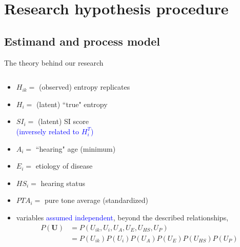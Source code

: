 \section{Research hypothesis procedure}
%
%
\subsection{Estimand and process model}
%
%
\begin{frame}[t, negative]
	\subsectionpage
\end{frame}
%
%
\begin{frame}
	{The theory behind our research}
	\begin{columns}
		\begin{column}{0.5\textwidth}
			\begin{itemize}
				\item $H_{ik}=$ (observed) entropy replicates
				\item $H_{i}=$ (latent) ``true" entropy
				\item $SI_{i}=$ (latent) SI score \\
				{\small \textcolor{blue}{(inversely related to $H^{T}_{i}$)} }
				\item $A_{i}=$ ``hearing" age (minimum)
				\item $E_{i}=$ etiology of disease
				\item $HS_{i}=$ hearing status
				\item $PTA_{i}=$ pure tone average (standardized)
				\item variables \textcolor{blue}{assumed independent}, beyond the described relationships,
				\begin{equation*}
					\begin{aligned} 
						P(\pmb{U}) & = P(U_{ik}, U_{i}, U_{A}, U_{E}, U_{HS}, U_{P}) \\ %
						& = P(U_{ik}) P(U_{i}) P(U_{A}) P(U_{E}) P(U_{HS}) P(U_{P}) %
					\end{aligned}
				\end{equation*}
			\end{itemize}
		\end{column}

\end{columns}
\end{frame}
